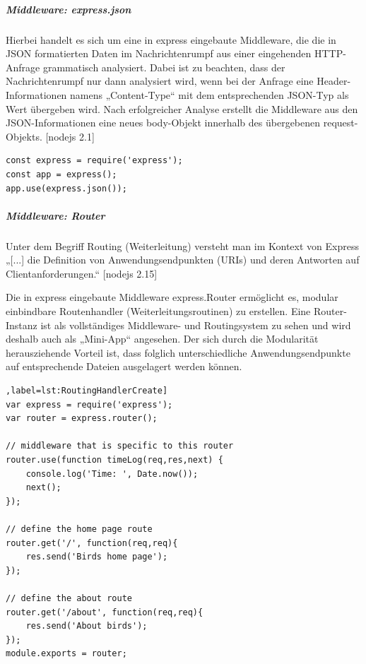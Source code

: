 \subparagraph{Middleware: express.json}

\noindent
Hierbei handelt es sich um eine in express eingebaute Middleware, die die in JSON formatierten Daten im Nachrichtenrumpf aus einer eingehenden HTTP-Anfrage grammatisch analysiert.  Dabei ist zu beachten, dass der Nachrichtenrumpf nur dann analysiert wird, wenn bei der Anfrage eine Header-Informationen namens „Content-Type“ mit dem entsprechenden JSON-Typ als Wert übergeben wird. Nach erfolgreicher Analyse erstellt die Middleware aus den JSON-Informationen eine neues body-Objekt innerhalb des übergebenen request-Objekts. [nodejs 2.1]
\newline

\begin{lstlisting}[caption=Express.json Middleware benutzen,label=lst:ExpressNutzen]
const express = require('express');
const app = express();
app.use(express.json());
\end{lstlisting}

\newpage
\subparagraph{Middleware: Router}

\noindent
Unter dem Begriff Routing (Weiterleitung) versteht man im Kontext von Express „[...] die Definition von Anwendungsendpunkten (URIs) und deren Antworten auf Clientanforderungen.“ [nodejs 2.15]
\newline

\noindent
Die in express eingebaute Middleware express.Router ermöglicht es, modular einbindbare Routenhandler (Weiterleitungsroutinen) zu erstellen. Eine Router-Instanz ist als vollständiges Middleware- und Routingsystem zu sehen und wird deshalb auch als „Mini-App“ angesehen. Der sich durch die Modularität herausziehende Vorteil ist, dass folglich unterschiedliche Anwendungsendpunkte auf entsprechende Dateien ausgelagert werden können.
\newline

\begin{lstlisting}[caption=Routinghandler erstellen[nodejs 2.2],label=lst:RoutingHandlerCreate]
var express = require('express');
var router = express.router();

// middleware that is specific to this router
router.use(function timeLog(req,res,next) {
	console.log('Time: ', Date.now());
	next();
});

// define the home page route
router.get('/', function(req,req){
	res.send('Birds home page');
});

// define the about route
router.get('/about', function(req,req){
	res.send('About birds');
});
module.exports = router;
\end{lstlisting}

